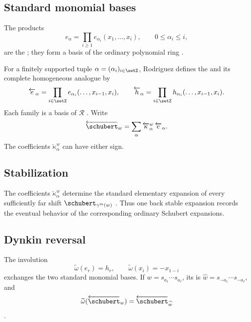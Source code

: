 \subsection[backStableStandardMonomials]{Standard monomial bases}

The products
\[
  e_\alpha=\prod_{i\geq1}e_{\alpha_i}(x_1,\dotsc,x_i),
  \qquad 0\leq\alpha_i\leq i,
\]
are the 
\label{standardElementaryMonomial}; they form a basis of the ordinary
polynomial ring \cite{FominGelfandPostnikov1997,Winkel1998}.

For a finitely supported tuple $\alpha=(\alpha_i)_{i\in\setZ}$, Rodriguez
defines the 
\label{backStableSEM} and its complete homogeneous analogue
\label{backStableCHM} by
\[
  \overleftarrow{e}_\alpha
  =\prod_{i\in\setZ}e_{\alpha_i}(\dotsc,x_{i-1},x_i),
  \qquad
  \overleftarrow{h}_\alpha
  =\prod_{i\in\setZ}h_{\alpha_i}(\dotsc,x_{i-1},x_i).
\]
Each family is a basis of $\mathcal R$
\cite[Thm.~3.3 and Cor.~4.5]{Rodriguez2026x}.  Write
\[
  \overleftarrow{\schubert}_w
  =
  \sum_\alpha
  \overleftarrow{\kappa}^w_\alpha\,\overleftarrow{e}_\alpha.
\]
The coefficients $\overleftarrow{\kappa}^w_\alpha$ can have either sign.


\subsection[backStableSEMStabilization]{Stabilization}

The coefficients $\overleftarrow{\kappa}^w_\alpha$ determine the standard
elementary expansion of every sufficiently far shift
$\schubert_{\gamma^m(w)}$ \cite[Thm.~3.7]{Rodriguez2026x}.  Thus one back
stable expansion records the eventual behavior of the corresponding ordinary
Schubert expansions.


\subsection[backStableDynkinReversal]{Dynkin reversal}

The involution
\[
  \widetilde\omega(e_r)=h_r,
  \qquad
  \widetilde\omega(x_i)=-x_{1-i}
\]
exchanges the two standard monomial bases.  If $w=s_{a_1}\dotsm s_{a_\ell}$,
its \label{dynkinReversal} is
$\widehat w=s_{-a_1}\dotsm s_{-a_\ell}$, and
\[
  \widetilde\omega(\overleftarrow{\schubert}_w)
  =
  \overleftarrow{\schubert}_{\widehat w}
\]
\cite[Thms.~4.3--4.6]{Rodriguez2026x}.


